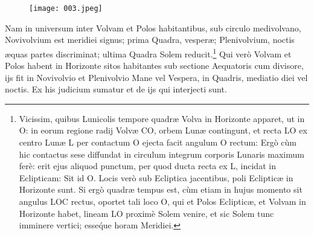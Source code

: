 \documentclass[a4paper, 11pt, oneside, polutonikogreek, german]{article}
\begin{document}
{\begin{figure}[H]
\centering
\texttt{[image: 003.jpeg]}
\end{figure}} Nam in universum inter Volvam et Polos habitantibus, sub circulo medivolvano, Novivolvium est meridiei signus; prima Quadra, vesperæ; Plenivolvium, noctis æquas partes discriminat; ultima Quadra Solem reducit.\footnote{Vicissim, quibus Lunicolis tempore quadræ Volva in Horizonte apparet, ut in O: in eorum regione radij Volvæ CO, orbem Lunæ contingunt, et recta LO ex centro Lunæ L per contactum O ejecta facit angulum O rectum: Ergò cùm hic contactus sese diffundat in circulum integrum corporis Lunaris maximum ferè: erit ejus aliquod punctum, per quod ducta recta ex L, incidat in Eclipticam: Sit id O. Locis verò sub Ecliptica jacentibus, poli Eclipticæ in Horizonte sunt. Si ergò quadræ tempus est, cùm etiam in hujus momento sit angulus LOC rectus, oportet tali loco O, qui et Polos Eclipticæ, et Volvam in Horizonte habet, lineam LO proximè Solem venire, et sic Solem tunc imminere vertici; esse\'que horam Meridiei.} Qui verò Volvam et Polos habent in Horizonte sitos habitantes sub sectione Aequatoris cum divisore, ijs fit in Novivolvio et Plenivolvio Mane vel Vespera, in Quadris, mediatio diei vel noctis. Ex his judicium sumatur et de ijs qui interjecti sunt.
\end{document}
